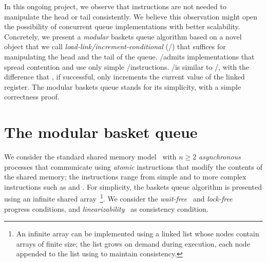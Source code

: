 In this ongoing project, we observe that \RMW instructions are not needed to manipulate the head or tail consistently. We believe this observation might open the possibility of concurrent queue implementations with better scalability.  Concretely, we present a \emph{modular} baskets queue algorithm based on a novel object that we call \emph{load-link/increment-conditional} (\LL/\IC) that suffices for manipulating the head and the tail of the queue.  \LL/\IC admits implementations that spread contention and use only simple \R/\W instructions.  \LL/\IC is similar to \LL/\SC, with the difference that \IC, if successful, only increments the current value of the linked register.  The modular baskets queue stands for its simplicity, with a simple correctness proof.

\section{The modular basket queue}
\label{sec-basket-queue}

We consider the standard shared memory model~\cite{DBLP_journals_toplas_HerlihyW90} with $n \geq 2$ \emph{asynchronous} processes that communicate using \emph{atomic} instructions that modify the contents of the shared memory; the instructions range from simple \R and \W to more complex \RMW instructions such as \FAI and \CAS.  For simplicity, the baskets queue algorithm is presented using an infinite shared array~\footnote{An infinite array can be implemented using a linked list whose nodes contain arrays of finite size; the list grows on demand during execution, each node appended to the list using \CAS to maintain consistency.}.  We consider the \emph{wait-free}~\cite{DBLP_journals_toplas_Herlihy91} and \emph{lock-free}~\cite{DBLP_conf_opodis_HerlihyS11} progress conditions, and \emph{linearizability}~\cite{DBLP_journals_toplas_HerlihyW90} as consistency condition.

